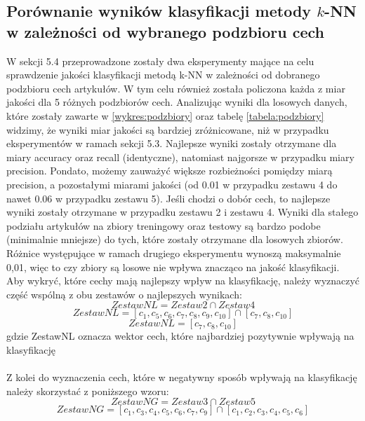 \documentclass{classrep}
\begin{document}
\subsection{Porównanie wyników klasyfikacji metody $k$-NN w zależności od wybranego podzbioru cech}
W sekcji 5.4 przeprowadzone zostały dwa eksperymenty mające na celu sprawdzenie jakości klasyfikacji metodą k-NN w zależności od dobranego podzbioru cech artykułów. W tym celu również została policzona każda z miar jakości dla 5 różnych podzbiorów cech.  Analizując wyniki dla losowych danych, które zostały zawarte w \ref{wykres:podzbiory} oraz tabelę \ref{tabela:podzbiory} widzimy, że wyniki miar jakości są bardziej zróżnicowane, niż w przypadku eksperymentów w ramach sekcji 5.3. Najlepsze wyniki zostały otrzymane dla miary accuracy oraz recall (identyczne), natomiast najgorsze w przypadku miary precision. Pondato, możemy zauważyć większe rozbieżności pomiędzy miarą precision, a pozostałymi miarami jakości (od 0.01 w przypadku zestawu 4 do nawet 0.06 w przypadku zestawu 5). Jeśli chodzi o dobór cech, to najlepsze wyniki zostały otrzymane w przypadku zestawu 2 i zestawu 4. Wyniki dla stałego podziału artykułów na zbiory treningowy oraz testowy są bardzo podobe (minimalnie mniejsze) do tych, które zostały otrzymane dla losowych zbiorów. Różnice występujące w ramach drugiego eksperymentu wynoszą maksymalnie 0,01, więc to czy zbiory są losowe nie wpływa znacząco na jakość klasyfikacji.
Aby wykryć, które cechy mają najlepszy wpływ na klasyfikację, należy wyznaczyć część wspólną z obu zestawów o najlepszych wynikach: 
\begin{equation}
    ZestawNL = Zestaw2  \cap  Zestaw4
\end{equation}
\begin{equation}
    ZestawNL = [c_{1}, c_{5}, c_{6}, c_{7}, c_{8}, c_{9}, c_{10}] \cap [c_{7}, c_{8}, c_{10}]
\end{equation}
\begin{equation}
    ZestawNL = [c_{7}, c_{8}, c_{10}]
\end{equation}
	\indent gdzie ZestawNL oznacza wektor cech, które najbardziej pozytywnie wpływają na klasyfikację \\
\\ Z kolei do wyznaczenia cech, które w negatywny sposób wpływają na klasyfikację należy skorzystać z poniższego wzoru:
\begin{equation}
ZestawNG = Zestaw3  \cap  Zestaw5
\end{equation}
\begin{equation}
ZestawNG = [c_{1}, c_{3}, c_{4}, c_{5}, c_{6}, c_{7}, c_{9}] \cap [c_{1}, c_{2}, c_{3}, c_{4}, c_{5}, c_{6}]
\end{equation}
\end{document}
